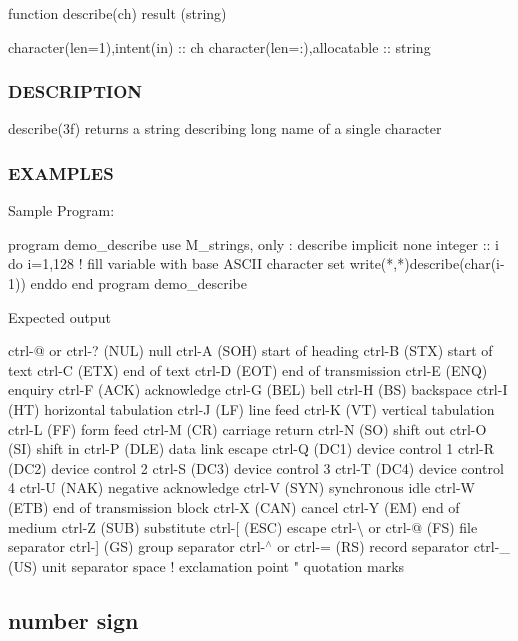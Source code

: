 \begin{DoxyVerb}function describe(ch) result (string)

 character(len=1),intent(in)   :: ch
 character(len=:),allocatable  :: string
\end{DoxyVerb}
 \subsubsection*{D\+E\+S\+C\+R\+I\+P\+T\+I\+ON}

describe(3f) returns a string describing long name of a single character

\subsubsection*{E\+X\+A\+M\+P\+L\+ES}

Sample Program\+: \begin{DoxyVerb}program demo_describe
 use M_strings, only : describe
 implicit none
 integer :: i
    do i=1,128  ! fill variable with base ASCII character set
       write(*,*)describe(char(i-1))
    enddo
end program demo_describe
\end{DoxyVerb}


Expected output

ctrl-\/@ or ctrl-\/? (N\+UL) null ctrl-\/A (S\+OH) start of heading ctrl-\/B (S\+TX) start of text ctrl-\/C (E\+TX) end of text ctrl-\/D (E\+OT) end of transmission ctrl-\/E (E\+NQ) enquiry ctrl-\/F (A\+CK) acknowledge ctrl-\/G (B\+EL) bell ctrl-\/H (BS) backspace ctrl-\/I (HT) horizontal tabulation ctrl-\/J (LF) line feed ctrl-\/K (VT) vertical tabulation ctrl-\/L (FF) form feed ctrl-\/M (CR) carriage return ctrl-\/N (SO) shift out ctrl-\/O (SI) shift in ctrl-\/P (D\+LE) data link escape ctrl-\/Q (D\+C1) device control 1 ctrl-\/R (D\+C2) device control 2 ctrl-\/S (D\+C3) device control 3 ctrl-\/T (D\+C4) device control 4 ctrl-\/U (N\+AK) negative acknowledge ctrl-\/V (S\+YN) synchronous idle ctrl-\/W (E\+TB) end of transmission block ctrl-\/X (C\+AN) cancel ctrl-\/Y (EM) end of medium ctrl-\/Z (S\+UB) substitute ctrl-\/\mbox{[} (E\+SC) escape ctrl-\/\textbackslash{} or ctrl-\/@ (FS) file separator ctrl-\/\mbox{]} (GS) group separator ctrl-\/$^\wedge$ or ctrl-\/= (RS) record separator ctrl-\/\+\_\+ (US) unit separator space ! exclamation point " quotation marks \subsection*{number sign}

